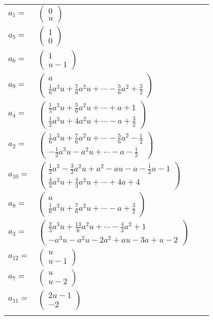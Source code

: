 \documentclass[1p]{elsarticle_modified}
\theoremstyle{definition}
\begin{document}
\begin{tabular}{m{7pt} m{180pt} m{7pt} m{180pt} }
\flushright $a_{1}=$&$\begin{pmatrix}0\\u\end{pmatrix}$ \\
\flushright $a_{5}=$&$\begin{pmatrix}1\\0\end{pmatrix}$ \\
\flushright $a_{6}=$&$\begin{pmatrix}1\\u-1\end{pmatrix}$ \\
\flushright $a_{9}=$&$\begin{pmatrix}a\\\frac{1}{6} a^3 u+\frac{7}{6} a^2 u+\cdots-\frac{5}{6} a^2+\frac{3}{2}\end{pmatrix}$ \\
\flushright $a_{4}=$&$\begin{pmatrix}\frac{1}{3} a^3 u+\frac{5}{6} a^2 u+\cdots+a+1\\\frac{1}{2} a^3 u+4 a^2 u+\cdots- a+\frac{3}{2}\end{pmatrix}$ \\
\flushright $a_{2}=$&$\begin{pmatrix}\frac{1}{6} a^3 u+\frac{7}{6} a^2 u+\cdots-\frac{5}{6} a^2-\frac{1}{2}\\-\frac{1}{2} a^3 u- a^2 u+\cdots- a-\frac{1}{2}\end{pmatrix}$ \\
\flushright $a_{10}=$&$\begin{pmatrix}\frac{1}{2} a^3-\frac{3}{2} a^2 u+a^2- a u- a-\frac{1}{2} u-1\\\frac{4}{3} a^3 u+\frac{4}{3} a^2 u+\cdots+4 a+4\end{pmatrix}$ \\
\flushright $a_{8}=$&$\begin{pmatrix}a\\\frac{1}{6} a^3 u+\frac{7}{6} a^2 u+\cdots- a+\frac{3}{2}\end{pmatrix}$ \\
\flushright $a_{3}=$&$\begin{pmatrix}\frac{2}{3} a^3 u+\frac{13}{6} a^2 u+\cdots-\frac{4}{3} a^2+1\\- a^3 u- a^2 u-2 a^2+a u-3 a+u-2\end{pmatrix}$ \\
\flushright $a_{12}=$&$\begin{pmatrix}u\\u-1\end{pmatrix}$ \\
\flushright $a_{7}=$&$\begin{pmatrix}u\\u-2\end{pmatrix}$ \\
\flushright $a_{11}=$&$\begin{pmatrix}2 u-1\\-2\end{pmatrix}$\\&\end{tabular}
\end{document}
